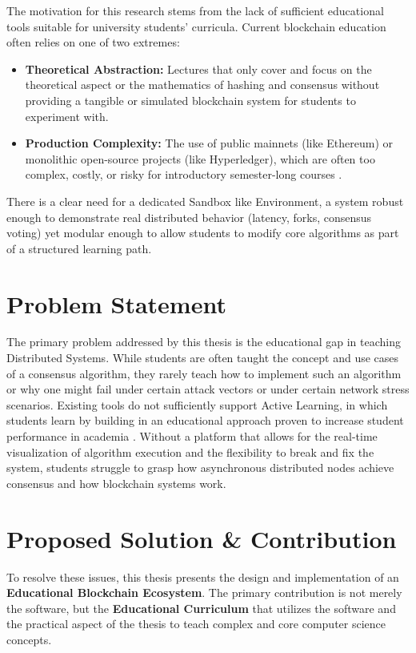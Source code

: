 The motivation for this research stems from the lack of sufficient educational tools suitable for university students' curricula. Current blockchain education often relies on one of two extremes:
\begin{itemize}
    \item \textbf{Theoretical Abstraction:} Lectures that only cover and focus on the theoretical aspect or the mathematics of hashing and consensus without providing a tangible or simulated blockchain system for students to experiment with.
    \item \textbf{Production Complexity:} The use of public mainnets (like Ethereum) or monolithic open-source projects (like Hyperledger), which are often too complex, costly, or risky for introductory semester-long courses \cite{yumna2019blockchain}.
\end{itemize}
There is a clear need for a dedicated Sandbox like Environment, a system robust enough to demonstrate real distributed behavior (latency, forks, consensus voting) yet modular enough to allow students to modify core algorithms as part of a structured learning path.

\section{Problem Statement} \label{ch1_problem_statement}

The primary problem addressed by this thesis is the educational gap in teaching Distributed Systems. While students are often taught the concept and use cases of a consensus algorithm, they rarely teach how to implement such an algorithm or why one might fail under certain attack vectors or under certain network stress scenarios. Existing tools do not sufficiently support Active Learning, in which students learn by building in an educational approach proven to increase student performance in academia \cite{freeman2014active}. Without a platform that allows for the real-time visualization of algorithm execution and the flexibility to break and fix the system, students struggle to grasp how asynchronous distributed nodes achieve consensus and how blockchain systems work\cite{hundhausen2002meta}.

\section{Proposed Solution \& Contribution} \label{ch1_solution}

To resolve these issues, this thesis presents the design and implementation of an \textbf{Educational Blockchain Ecosystem}. The primary contribution is not merely the software, but the \textbf{Educational Curriculum} that utilizes the software and the practical aspect of the thesis to teach complex and core computer science concepts.

